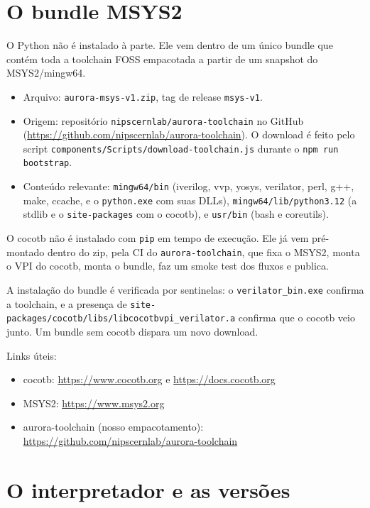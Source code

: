 \documentclass[11pt,a4paper]{article}
\begin{document}
\section{O bundle MSYS2}

O Python não é instalado à parte. Ele vem dentro de um único bundle que contém
toda a toolchain FOSS empacotada a partir de um snapshot do MSYS2/mingw64.

\begin{itemize}
  \item Arquivo: \texttt{aurora-msys-v1.zip}, tag de release \texttt{msys-v1}.
  \item Origem: repositório \texttt{nipscernlab/aurora-toolchain} no GitHub
        (\url{https://github.com/nipscernlab/aurora-toolchain}). O download é
        feito pelo script \texttt{components/Scripts/download-toolchain.js}
        durante o \texttt{npm run bootstrap}.
  \item Conteúdo relevante: \texttt{mingw64/bin} (iverilog, vvp, yosys, verilator,
        perl, g++, make, ccache, e o \texttt{python.exe} com suas DLLs),
        \texttt{mingw64/lib/python3.12} (a stdlib e o \texttt{site-packages} com o
        cocotb), e \texttt{usr/bin} (bash e coreutils).
\end{itemize}

O cocotb não é instalado com \texttt{pip} em tempo de execução. Ele já vem
pré-montado dentro do zip, pela CI do \texttt{aurora-toolchain}, que fixa o MSYS2,
monta o VPI do cocotb, monta o bundle, faz um smoke test dos fluxos e publica.

A instalação do bundle é verificada por sentinelas: o \texttt{verilator\_bin.exe}
confirma a toolchain, e a presença de
\texttt{site-packages/cocotb/libs/libcocotbvpi\_verilator.a} confirma que o cocotb
veio junto. Um bundle sem cocotb dispara um novo download.

Links úteis:

\begin{itemize}
  \item cocotb: \url{https://www.cocotb.org} e \url{https://docs.cocotb.org}
  \item MSYS2: \url{https://www.msys2.org}
  \item aurora-toolchain (nosso empacotamento):
        \url{https://github.com/nipscernlab/aurora-toolchain}
\end{itemize}

\section{O interpretador e as versões}
\end{document}
